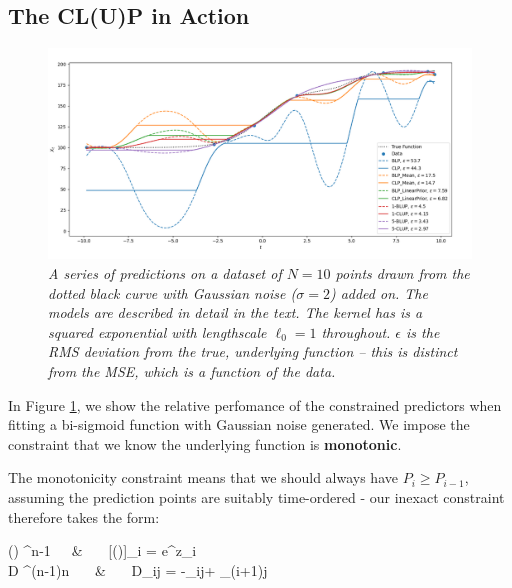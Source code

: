 \documentclass[]{article}
\begin{document}
	\subsection{The CL(U)P in Action}

		\begin{figure}[t]
			\includegraphics[width=\linewidth,keepaspectratio=true]{Figs/CLUP_comparison.png}
			\caption{\it A series of predictions on a dataset of $N=10$ points drawn from the dotted black curve with Gaussian noise ($\sigma=2$) added on. The models are described in detail in the text. The kernel has is a squared exponential with lengthscale $\ell_0 = 1$ throughout. $\epsilon$ is the RMS deviation from the true, underlying function -- this is distinct from the MSE, which is a function of the data.}\label{F:CLUP}
		\end{figure}

		

		In Figure \ref{F:CLUP}, we show the relative perfomance of the constrained predictors when fitting a bi-sigmoid function with Gaussian noise generated. We impose the constraint that we know the underlying function is \textbf{monotonic}.
		
		The monotonicity constraint means that we should always have $P_{i} \geq P_{i-1}$, assuming the prediction points are suitably time-ordered - our inexact constraint therefore takes the form:
		\begin{spalign}
			() \in {}^{n-1}~~~&~~~ 	[()]_i = e^{z_i}
			\\
			D \in {}^{(n-1)\times n} ~~~&~~~ D_{ij}  = -\delta_{ij}+ \delta_{(i+1)j}\label{E:CLP_Monotone}
		\end{spalign}
\end{document}
